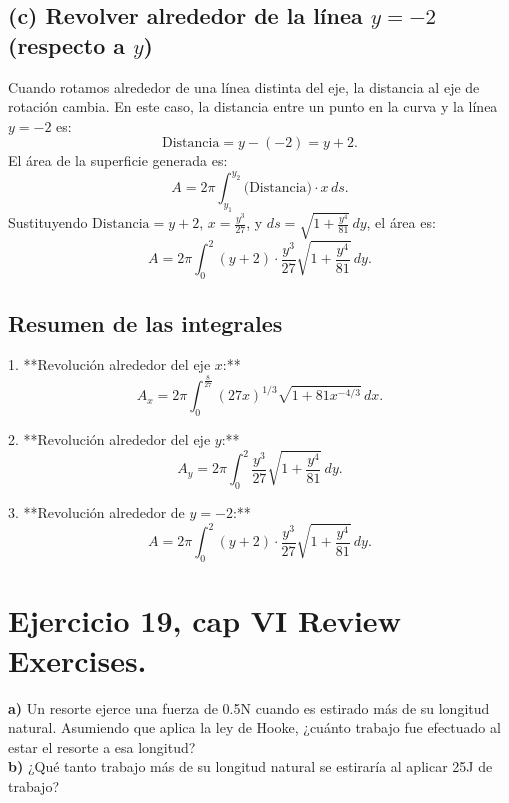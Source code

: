 \documentclass[11pt,letterpaper]{article}
\begin{document}
\subsection*{(c) Revolver alrededor de la línea \(y = -2\) (respecto a \(y\))}

Cuando rotamos alrededor de una línea distinta del eje, la distancia al eje de rotación cambia. En este caso, la distancia entre un punto en la curva y la línea \(y = -2\) es:
\[
\text{Distancia} = y - (-2) = y + 2.
\]
El área de la superficie generada es:
\[
A = 2\pi \int_{y_1}^{y_2} \text{(Distancia)} \cdot x \, ds.
\]
Sustituyendo \(\text{Distancia} = y + 2\), \(x = \frac{y^3}{27}\), y \(ds = \sqrt{1 + \frac{y^4}{81}} \, dy\), el área es:
\[
A = 2\pi \int_{0}^{2} (y + 2) \cdot \frac{y^3}{27} \sqrt{1 + \frac{y^4}{81}} \, dy.
\]

\subsection*{Resumen de las integrales}

1. **Revolución alrededor del eje \(x\):**
\[
A_x = 2\pi \int_{0}^{\frac{8}{27}} (27x)^{1/3} \sqrt{1 + 81x^{-4/3}} \, dx.
\]

2. **Revolución alrededor del eje \(y\):**
\[
A_y = 2\pi \int_{0}^{2} \frac{y^3}{27} \sqrt{1 + \frac{y^4}{81}} \, dy.
\]

3. **Revolución alrededor de \(y = -2\):**
\[
A = 2\pi \int_{0}^{2} (y + 2) \cdot \frac{y^3}{27} \sqrt{1 + \frac{y^4}{81}} \, dy.
\]


\section{Ejercicio 19, cap VI Review Exercises.}
\textbf{a)} Un resorte ejerce una fuerza de 0.5N cuando es estirado más de su longitud natural.
Asumiendo que aplica la ley de Hooke, ¿cuánto trabajo fue efectuado al estar el resorte a esa longitud?\\
\textbf{b)} ¿Qué tanto trabajo más de su longitud natural se estiraría al aplicar 25J de trabajo?
\end{document}
